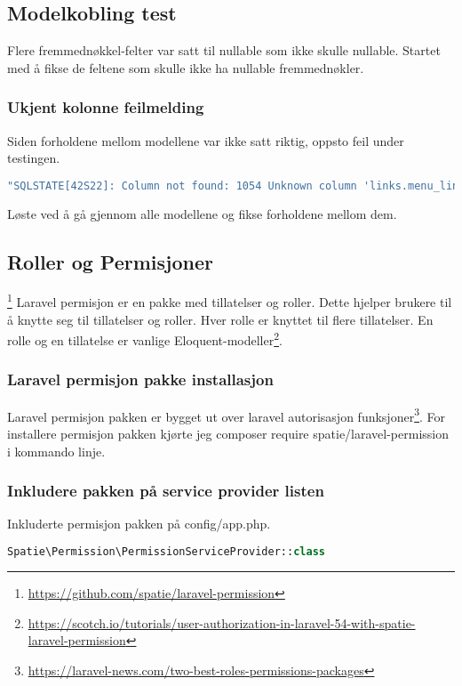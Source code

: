 \subsection{Modelkobling test}
Flere fremmednøkkel-felter var satt til nullable som ikke skulle nullable. Startet med å fikse de feltene som skulle ikke ha nullable fremmednøkler.

\subsubsection{Ukjent kolonne feilmelding}
Siden forholdene mellom modellene var ikke satt riktig, oppsto feil under testingen.
\begin{lstlisting}[language=PHP]
"SQLSTATE[42S22]: Column not found: 1054 Unknown column 'links.menu_link_id' in 'where clause' (SQL: select * from links where links.`menu_link_id` = 3 and links.`menu_link_id` is not null) 
\end{lstlisting}
Løste ved å gå gjennom alle modellene og fikse forholdene mellom dem.

\subsection{Roller og Permisjoner}\footnote{\url{https://github.com/spatie/laravel-permission}}
Laravel permisjon er en pakke med tillatelser og roller. Dette hjelper brukere til å knytte seg til tillatelser og roller. Hver rolle er knyttet til flere tillatelser. En rolle og en tillatelse er vanlige Eloquent-modeller\footnote{\url{https://scotch.io/tutorials/user-authorization-in-laravel-54-with-spatie-laravel-permission}}.
\subsubsection{Laravel permisjon pakke installasjon} 
Laravel permisjon pakken er bygget ut over laravel autorisasjon funksjoner\footnote{\url{https://laravel-news.com/two-best-roles-permissions-packages}}.
For installere permisjon pakken kjørte jeg composer require spatie/laravel-permission i kommando linje.

\subsubsection{Inkludere pakken på service provider listen}
Inkluderte permisjon pakken på config/app.php. 
\begin{lstlisting}[language=PHP]
    Spatie\Permission\PermissionServiceProvider::class
\end{lstlisting}

